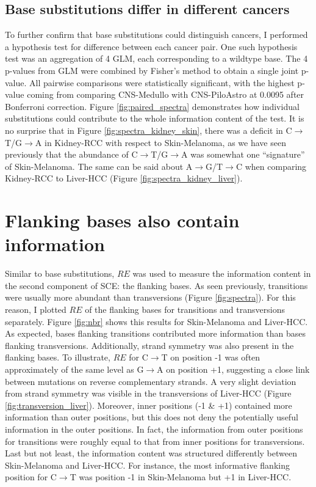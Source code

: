 

\subsection{Base substitutions differ in different cancers}
To further confirm that base substitutions could distinguish cancers, I performed a hypothesis test for difference between each cancer pair. One such hypothesis test was an aggregation of 4 GLM, each corresponding to a wildtype base. The 4 p-values from GLM were combined by Fisher's method to obtain a single joint p-value. All pairwise comparisons were statistically significant, with the highest p-value coming from comparing CNS-Medullo with CNS-PiloAstro at 0.0095 after Bonferroni correction. Figure \ref{fig:paired_spectra} demonstrates how individual substitutions could contribute to the whole information content of the test. It is no surprise that in Figure \ref{fig:spectra_kidney_skin}, there was a deficit in C$\rightarrow$T/G$\rightarrow$A in Kidney-RCC with respect to Skin-Melanoma, as we have seen previously that the abundance of C$\rightarrow$T/G$\rightarrow$A was somewhat one ``signature'' of Skin-Melanoma. The same can be said about A$\rightarrow$G/T$\rightarrow$C when comparing Kidney-RCC to Liver-HCC (Figure \ref{fig:spectra_kidney_liver}).



\section{Flanking bases also contain information}
Similar to base substitutions, $RE$ was used to measure the information content in the second component of SCE: the flanking bases. As seen previously, transitions were usually more abundant than transversions (Figure \ref{fig:spectra}). For this reason, I plotted $RE$ of the flanking bases for transitions and transversions separately. Figure \ref{fig:nbr} shows this results for Skin-Melanoma and Liver-HCC. As expected, bases flanking transitions contributed more information than bases flanking transversions. Additionally, strand symmetry was also present in the flanking bases. To illustrate, $RE$ for C$\rightarrow$T on position -1 was often approximately of the same level as G$\rightarrow$A on position +1, suggesting a close link between mutations on reverse complementary strands. A very slight deviation from strand symmetry was visible in the transversions of Liver-HCC (Figure \ref{fig:transversion_liver}). Moreover, inner positions (-1 \& +1) contained more information than outer positions, but this does not deny the potentially useful information in the outer positions. In fact, the information from outer positions for transitions were roughly equal to that from inner positions for transversions. Last but not least, the information content was structured differently between Skin-Melanoma and Liver-HCC. For instance, the most informative flanking position for C$\rightarrow$T was position -1 in Skin-Melanoma but +1 in Liver-HCC.

